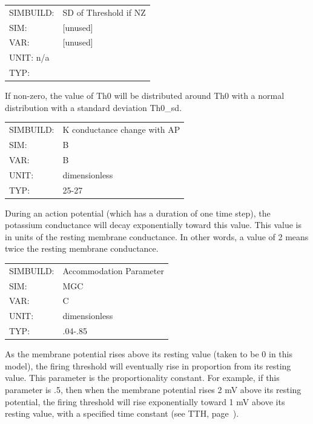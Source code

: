 \documentclass[12pt,openany,oneside]{book}
\newcommand{\tiref}[1]{#1, page~\pageref{#1}}
\begin{document}
\begin{flushleft}
\begin{tabular}{@{}ll@{}}
SIMBUILD: & SD of Threshold if NZ\\
SIM: & [unused]\\
VAR: & [unused]\\
UNIT: n/a\\
TYP: &\\
\end{tabular}
\end{flushleft}
\noindent
If non-zero, the value of Th0 will be distributed
around Th0 with a normal distribution with a standard deviation Th0\_sd.
\filbreak
\vspace{\baselineskip}

\label{B}
\begin{flushleft}
\begin{tabular}{@{}ll@{}}
SIMBUILD: & K conductance change with AP\\
SIM: & B\\
VAR: & B\\
UNIT: & dimensionless\\
TYP: & 25-27\\
\end{tabular}
\end{flushleft}
\noindent
During an action potential (which has a duration of one time step),
the potassium conductance will decay exponentially toward this value.
This value is in units of the resting membrane conductance. In other
words, a value of 2 means twice the resting membrane conductance.
\filbreak
\vspace{\baselineskip}

\begin{flushleft}
\begin{tabular}{@{}ll@{}}
SIMBUILD: & Accommodation Parameter\\
SIM: & MGC\\
VAR: & C\\
UNIT: & dimensionless\\
TYP: & .04-.85\\
\end{tabular}
\end{flushleft}
\noindent
As the membrane potential rises above its resting value (taken to be 0
in this model), the firing threshold will eventually rise in
proportion from its resting value. This parameter is the
proportionality constant. For example, if this parameter is .5, then
when the membrane potential rises 2 mV above its resting potential,
the firing threshold will rise exponentially toward 1 mV above its
resting value, with a specified time constant (see \tiref{TTH}).
\filbreak
\vspace{\baselineskip}
\end{document}
